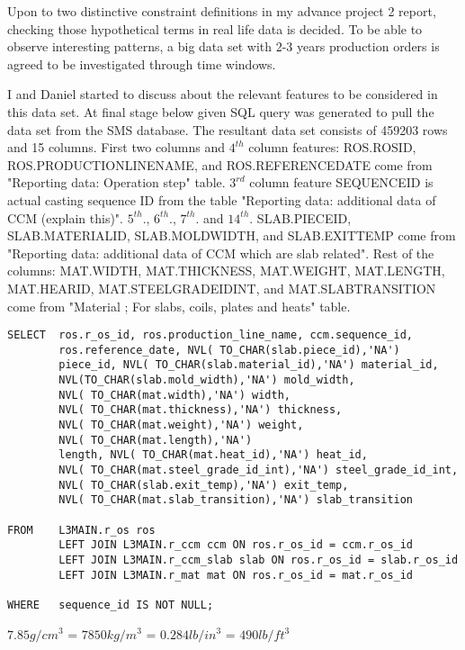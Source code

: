 \documentclass{article}
\begin{document}
Upon to two distinctive constraint definitions in my advance project 2 report, checking those hypothetical terms in real life data is decided. To be able to observe interesting patterns, a big data set with 2-3 years production orders is agreed to be investigated through time windows. 

I and Daniel started to discuss about the relevant features to be considered in this data set. At final stage below given SQL query was generated to pull the data set from the SMS database. The resultant data set consists of 459203 rows and 15 columns. First two columns and $4^{th}$ column features: ROS.R\textunderscore OS\textunderscore ID, ROS.PRODUCTION\textunderscore LINE\textunderscore NAME, and ROS.REFERENCE\textunderscore DATE come from "Reporting data: Operation step" table. $3^{rd}$ column feature SEQUENCE\textunderscore ID is actual casting sequence ID from the table "Reporting data: additional data of CCM (explain this)". $5^{th}$., $6^{th}$., $7^{th}$. and $14^{th}$. SLAB.PIECE\textunderscore ID, SLAB.MATERIAL\textunderscore ID, SLAB.MOLD\textunderscore WIDTH, and SLAB.EXIT\textunderscore TEMP come from "Reporting data: additional data of CCM which are slab related". Rest of the columns: MAT.WIDTH, MAT.THICKNESS, MAT.WEIGHT, MAT.LENGTH, MAT.HEAR\textunderscore ID, MAT.STEEL\textunderscore GRADE\textunderscore ID\textunderscore INT, and MAT.SLAB\textunderscore TRANSITION come from "Material ;  For slabs, coils, plates and heats" table.

\begin{lstlisting}
SELECT  ros.r_os_id, ros.production_line_name, ccm.sequence_id,        
        ros.reference_date, NVL( TO_CHAR(slab.piece_id),'NA') 
        piece_id, NVL( TO_CHAR(slab.material_id),'NA') material_id, 
        NVL(TO_CHAR(slab.mold_width),'NA') mold_width, 
        NVL( TO_CHAR(mat.width),'NA') width, 
        NVL( TO_CHAR(mat.thickness),'NA') thickness, 
        NVL( TO_CHAR(mat.weight),'NA') weight, 
        NVL( TO_CHAR(mat.length),'NA')
        length, NVL( TO_CHAR(mat.heat_id),'NA') heat_id, 
        NVL( TO_CHAR(mat.steel_grade_id_int),'NA') steel_grade_id_int, 
        NVL( TO_CHAR(slab.exit_temp),'NA') exit_temp, 
        NVL( TO_CHAR(mat.slab_transition),'NA') slab_transition

FROM   	L3MAIN.r_os ros 
        LEFT JOIN L3MAIN.r_ccm ccm ON ros.r_os_id = ccm.r_os_id 
        LEFT JOIN L3MAIN.r_ccm_slab slab ON ros.r_os_id = slab.r_os_id 
        LEFT JOIN L3MAIN.r_mat mat ON ros.r_os_id = mat.r_os_id 

WHERE  	sequence_id IS NOT NULL;
\end{lstlisting}
$7.85 g/cm^{3}$ = $7850 kg/m^{3}$ = $0.284 lb/in^{3}$ = $490 lb/ft^{3}$
\end{document}
